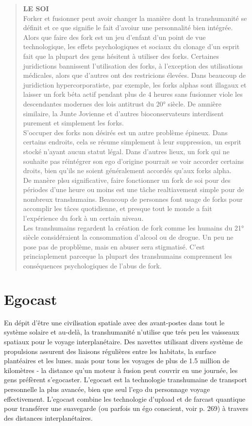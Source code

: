 \begin{quotation} \textbf{LE SOI} \\ Forker et fusionner peut avoir changer la manière dont la transhumanité se définit et ce que signifie le fait d'avoiur une personnalité bien intégrée. \\ Alors que faire des fork est un jeu d'enfant d'un point de vue technologique, les effets psychologiques et sociaux du clonage d'un esprit fait que la plupart des gens hésitent à utiliser des forks. Certaines juridictions bannissent l'utilisation des forks, à l'exception des utilisations médicales, alors que d'autres ont des restricions élevées. Dans beaucoup de juridiction hypercorporatiste, par exemple, les forks alphas sont illagaux et laisser un fork béta actif pendant plus de 4 heures sans fusionner viole les descendantes modernes des lois antitrust du 20° siècle. De amnière similaire, la Junte Jovienne et d'autres bioconservateurs interdisent purement et simplement les forks. \\ S'occuper des forks non désirés est un autre problème épineux. Dans certains endroits, cela se résume simplement à leur suppression, un esprit stocké n'ayant aucun statut légal. Dans d'autres lieux, un fork qui ne souhaite pas réintégrer son ego d'origine pourrait se voir accorder certains droits, bien qu'ils ne soient généralement accordés qu'aux forks alpha. \\ De manère plsu significative, faire fonctionner un fork de soi pour des périodes d'une heure ou moins est une tâche realtiavement simple pour de nombreux transhumains. Beaucoup de personnes font usage de forks pour accomplir les tâces quotidienne, et presque tout le monde a fait l'expérience du fork à un certain niveau. \\ Les transhumains regardent la création de fork comme les humains du 21° siècle considéraient la consommation d'alcool ou de drogue. Un peu ne pose pas de propblème, mais en abuser sera stigmatisé. C'est princiaplement parceque la plupart des transhumains comprennent les conséquences psychologiques de l'abus de fork. \end{quotation} 

\section{Egocast} 

En dépit d'être une civilisation spatiale avec des avant-postes dans tout le système solaire et au-delà, la transhumanité n'utilise que trés peu les vaisseaux spatiaux pour le voyage interplanétaire. Des navettes utilisant divers système de propulsions assurent des liaisons régulières entre les habitats, la surface plantéaires et les lunes. mais pour tous les voyages de plus de 1.5 million de kilomètres - la distance qu'un moteur à fusion peut couvrir en une journée, les gens préfèrent s'egocaster. L'egocast est la technologie transhumaine de transport personnelle la plus avancée, bien que seul l'ego du personnage voyage effectivement. L'egocast combine les technologie d'upload et de farcast quantique pour transférer une suavegarde (ou parfois un égo conscient, voir p. 269) à travers des distances interplanétaires. 

